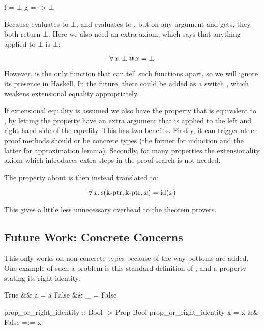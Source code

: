 \begin{code}[mathescape]
f = $\bot$
g = \x -> $\bot$
\end{code}

Because  evaluates to $\bot$, and  evaluates
to \hs{()}, but on any argument  and  gets, they both
return $\bot$. Here we also need an extra axiom, which says that
anything applied to $\bot$ is $\bot$:

\begin{equation*}
\forall \, x . \, \bot \, @ \, x = \bot
\end{equation*}

However,  is the only function that can tell such functions
apart, so we will ignore its presence in Haskell.  In the future,
there could be added as a switch , which weakens
extensional equality appropriately.

If extensional equality is assumed we also have the property that
 is equivalent to , by letting the
property have an extra argument that is applied to the left and right
hand side of the equality. This has two benefits. Firstly, it can
trigger other proof methods should  or  be concrete types
(the former for induction and the latter for approximation
lemma). Secondly, for many properties the extensionality axiom which
introduces extra steps in the proof search is not needed.

The property about  is then instead translated to:

\begin{equation*}
\forall \, x . \, \mathrm{s}(\mathrm{\operatorname{k-ptr}},\mathrm{\operatorname{k-ptr}},x) = \mathrm{id}(x)
\end{equation*}

This gives a little less unnecessary overhead to the theorem provers.

\subsection{Future Work: Concrete Concerns}
\label{sec:concreteconcerns}

This only works on non-concrete types because of the way bottoms are
added. One example of such a problem is this standard definition of
\hs{\&\&}, and a property stating its right identity:

\begin{code}
True  && a = a
False && _ = False

prop_or_right_identity :: Bool -> Prop Bool
prop_or_right_identity x = x && False =:= x
\end{code}

